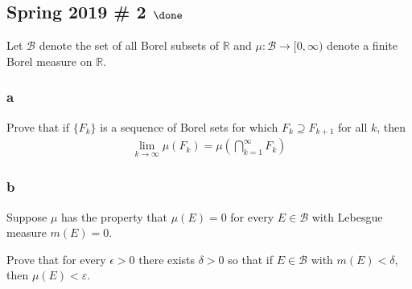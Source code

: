 \hypertarget{spring-2019-2-done}{%
\subsection{\texorpdfstring{Spring 2019 \# 2
\(\done\)}{Spring 2019 \# 2 \textbackslash done}}\label{spring-2019-2-done}}

Let \(\mathcal B\) denote the set of all Borel subsets of
\({\mathbb{R}}\) and \(\mu : \mathcal B \to [0, \infty)\) denote a
finite Borel measure on \({\mathbb{R}}\).

\hypertarget{a-2}{%
\subsubsection{a}\label{a-2}}

Prove that if \(\{F_k\}\) is a sequence of Borel sets for which
\(F_k \supseteq F_{k+1}\) for all \(k\), then
\begin{align*}
\lim _{k \rightarrow \infty} \mu\left(F_{k}\right)=\mu\left(\bigcap_{k=1}^{\infty} F_{k}\right)
\end{align*}

\hypertarget{b-2}{%
\subsubsection{b}\label{b-2}}

Suppose \(\mu\) has the property that \(\mu (E) = 0\) for every
\(E \in \mathcal B\) with Lebesgue measure \(m(E) = 0\).

Prove that for every \(\epsilon > 0\) there exists \(\delta > 0\) so
that if \(E \in \mathcal B\) with \(m(E) < δ\), then \(\mu(E) < ε\).


